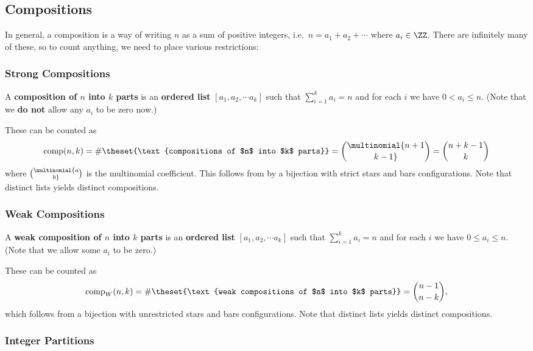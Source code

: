 \hypertarget{compositions}{%
\subsection{Compositions}\label{compositions}}

In general, a composition is a way of writing \(n\) as a sum of positive
integers, i.e.~\(n = a_1 + a_2 + \cdots\) where \(a_i \in \ZZ\). There
are infinitely many of these, so to count anything, we need to place
various restrictions:

\hypertarget{strong-compositions}{%
\subsubsection{Strong Compositions}\label{strong-compositions}}

A \textbf{composition of \(n\) into \(k\) parts} is an \textbf{ordered
list} \([a_1, a_2, \cdots a_k]\) such that \(\sum_{i=1}^k a_i = n\) and
for each \(i\) we have \(0 < a_i \leq n\). (Note that we \textbf{do not}
allow any \(a_i\) to be zero now.)

These can be counted as \[
\mathrm{comp}(n, k) = \#\theset{\text{compositions of $n$ into $k$ parts}} \\
= \multinomial{n+1 \choose k-1} \\ = {n+k-1 \choose k}
\] where \(\multinomial{a \choose b}\) is the multinomial coefficient.
This follows from by a bijection with strict stars and bars
configurations. Note that distinct lists yields distinct compositions.

\hypertarget{weak-compositions}{%
\subsubsection{Weak Compositions}\label{weak-compositions}}

A \textbf{weak composition of \(n\) into \(k\) parts} is an
\textbf{ordered list} \([a_1, a_2, \cdots a_k]\) such that
\(\sum_{i=1}^k a_i = n\) and for each \(i\) we have
\(0 \leq a_i \leq n\). (Note that we allow some \(a_i\) to be zero.)

These can be counted as \[
\mathrm{comp}_W(n, k)  = \#\theset{\text{weak compositions of $n$ into $k$ parts}} \\
= {n-1 \choose n-k},
\] which follows from a bijection with unrestricted stars and bars
configurations. Note that distinct lists yields distinct compositions.

\hypertarget{integer-partitions}{%
\subsubsection{Integer Partitions}\label{integer-partitions}}

